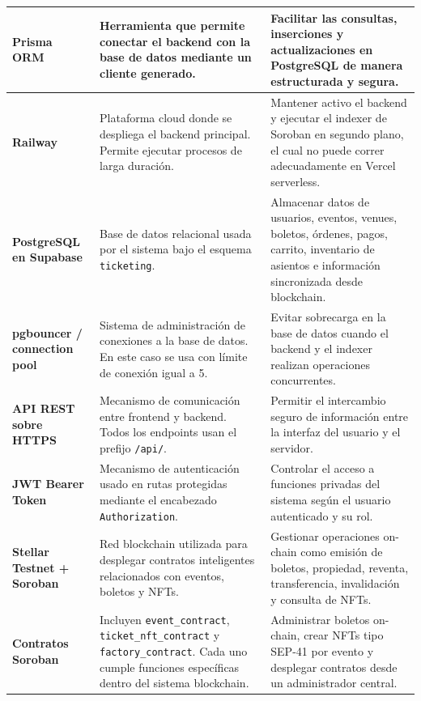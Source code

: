 \documentclass[12pt,letterpaper]{article}
\begin{document}
\begin{table}[htbp]
\begin{tabularx}{\textwidth}{|p{3.5cm}|X|X|}
\textbf{Prisma ORM} &
Herramienta que permite conectar el backend con la base de datos mediante un cliente generado. &
Facilitar las consultas, inserciones y actualizaciones en PostgreSQL de manera estructurada y segura. \\ \hline

\textbf{Railway} &
Plataforma cloud donde se despliega el backend principal. Permite ejecutar procesos de larga duración. &
Mantener activo el backend y ejecutar el indexer de Soroban en segundo plano, el cual no puede correr adecuadamente en Vercel serverless. \\ \hline

\textbf{PostgreSQL en Supabase} &
Base de datos relacional usada por el sistema bajo el esquema \texttt{ticketing}. &
Almacenar datos de usuarios, eventos, venues, boletos, órdenes, pagos, carrito, inventario de asientos e información sincronizada desde blockchain. \\ \hline

\textbf{pgbouncer / connection pool} &
Sistema de administración de conexiones a la base de datos. En este caso se usa con límite de conexión igual a 5. &
Evitar sobrecarga en la base de datos cuando el backend y el indexer realizan operaciones concurrentes. \\ \hline

\textbf{API REST sobre HTTPS} &
Mecanismo de comunicación entre frontend y backend. Todos los endpoints usan el prefijo \texttt{/api/}. &
Permitir el intercambio seguro de información entre la interfaz del usuario y el servidor. \\ \hline

\textbf{JWT Bearer Token} &
Mecanismo de autenticación usado en rutas protegidas mediante el encabezado \texttt{Authorization}. &
Controlar el acceso a funciones privadas del sistema según el usuario autenticado y su rol. \\ \hline

\textbf{Stellar Testnet + Soroban} &
Red blockchain utilizada para desplegar contratos inteligentes relacionados con eventos, boletos y NFTs. &
Gestionar operaciones on-chain como emisión de boletos, propiedad, reventa, transferencia, invalidación y consulta de NFTs. \\ \hline

\textbf{Contratos Soroban} &
Incluyen \texttt{event\_contract}, \texttt{ticket\_nft\_contract} y \texttt{factory\_contract}. Cada uno cumple funciones específicas dentro del sistema blockchain. &
Administrar boletos on-chain, crear NFTs tipo SEP-41 por evento y desplegar contratos desde un administrador central. \\ \hline


\end{tabularx}
\end{table}
\end{document}
